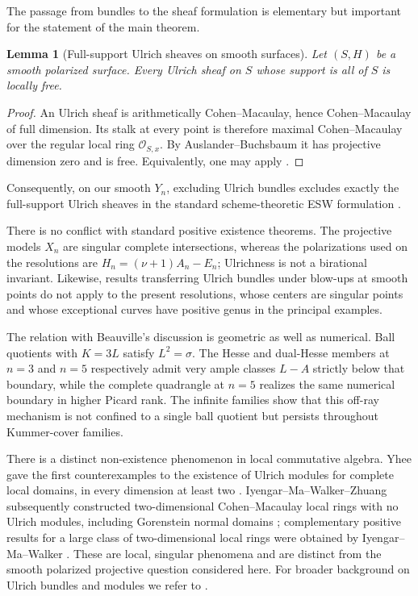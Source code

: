 \documentclass[11pt]{article}
\newtheorem{lemma}[theorem]{Lemma}
\newcommand{\OO}{\mathcal O}
\newcommand{\sig}{\sigma}
\begin{document}
The passage from bundles to the sheaf formulation is elementary but important
for the statement of the main theorem.

\begin{lemma}[Full-support Ulrich sheaves on smooth surfaces]\label{lem:full-support-bundle}
Let $(S,H)$ be a smooth polarized surface.  Every Ulrich sheaf on $S$ whose support
is all of $S$ is locally free.
\end{lemma}

\begin{proof}
An Ulrich sheaf is arithmetically Cohen--Macaulay, hence Cohen--Macaulay of full
dimension.  Its stalk at every point is therefore maximal Cohen--Macaulay over the
regular local ring $\OO_{S,x}$.  By Auslander--Buchsbaum it has projective dimension
zero and is free.  Equivalently, one may apply
\cite[Lemma~30.11.5, Tag~0B3K]{StacksCM}.
\end{proof}

Consequently, on our smooth $Y_n$, excluding Ulrich bundles excludes exactly the
full-support Ulrich sheaves in the standard scheme-theoretic ESW formulation
\cite[p.~543]{ESW}\cite[Proposition~4.2 and Problem~4.3]{HanselkaKummer}.

There is no conflict with standard positive existence theorems.  The projective
models $X_n$ are singular complete intersections, whereas the polarizations used
on the resolutions are $H_n=(\nu+1)A_n-E_n$; Ulrichness is not a birational
invariant.  Likewise, results transferring Ulrich bundles under blow-ups at
smooth points \cite{CasnatiKim,Secci} do not apply to the present resolutions,
whose centers are singular points and whose exceptional curves have positive
genus in the principal examples.

The relation with Beauville's discussion is geometric as well as numerical.
Ball quotients with $K=3L$ satisfy $L^2=\sig$.  The Hesse and dual-Hesse members at
$n=3$ and $n=5$ respectively admit very ample classes $L-A$ strictly below that
boundary, while the complete quadrangle at $n=5$ realizes the same numerical
boundary in higher Picard rank.  The infinite families show that this off-ray
mechanism is not confined to a single ball quotient but persists throughout
Kummer-cover families.

There is a distinct non-existence phenomenon in local commutative algebra.
Yhee gave the first counterexamples to the existence of Ulrich modules for
complete local domains, in every dimension at least two \cite{Yhee2023}.
Iyengar--Ma--Walker--Zhuang subsequently constructed two-dimensional
Cohen--Macaulay local rings with no Ulrich modules, including Gorenstein normal
domains \cite{IyengarMaWalkerZhuang}; complementary positive results for a large
class of two-dimensional local rings were obtained by Iyengar--Ma--Walker
\cite{IyengarMaWalker2025}.  These are local, singular phenomena and are distinct
from the smooth polarized projective question considered here.  For broader
background on Ulrich bundles and modules we refer to
\cite{CostaMiroRoigPonsLlopis}.
\end{document}

